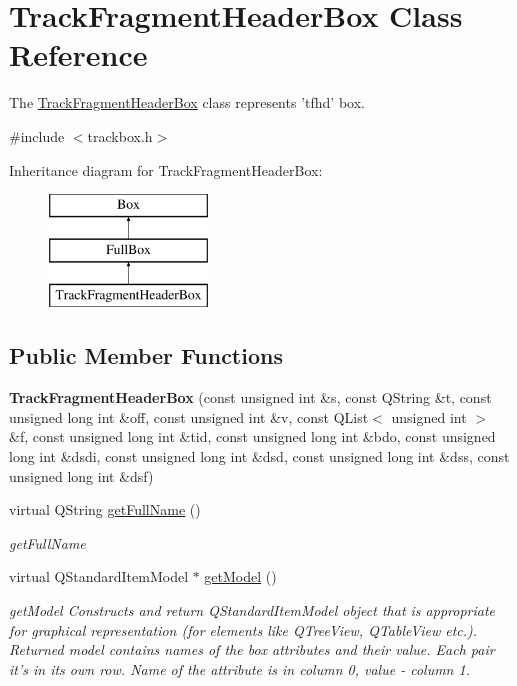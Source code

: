\hypertarget{class_track_fragment_header_box}{\section{Track\-Fragment\-Header\-Box Class Reference}
\label{class_track_fragment_header_box}
}


The \hyperlink{class_track_fragment_header_box}{Track\-Fragment\-Header\-Box} class represents 'tfhd' box.  




{\ttfamily \#include $<$trackbox.\-h$>$}

Inheritance diagram for Track\-Fragment\-Header\-Box\-:\begin{figure}[H]
\begin{center}
\leavevmode
\includegraphics[height=3.000000cm]{class_track_fragment_header_box}
\end{center}
\end{figure}
\subsection*{Public Member Functions}
\begin{DoxyCompactItemize}
\item 
\hypertarget{class_track_fragment_header_box_a603ad7cb83157c0bed94fdda506e6b07}{{\bfseries Track\-Fragment\-Header\-Box} (const unsigned int \&s, const Q\-String \&t, const unsigned long int \&off, const unsigned int \&v, const Q\-List$<$ unsigned int $>$ \&f, const unsigned long int \&tid, const unsigned long int \&bdo, const unsigned long int \&dsdi, const unsigned long int \&dsd, const unsigned long int \&dss, const unsigned long int \&dsf)}\label{class_track_fragment_header_box_a603ad7cb83157c0bed94fdda506e6b07}

\item 
virtual Q\-String \hyperlink{class_track_fragment_header_box_a6868fba2faed6053702b3c70751195e2}{get\-Full\-Name} ()
\begin{DoxyCompactList}\small\item\em get\-Full\-Name \end{DoxyCompactList}\item 
virtual Q\-Standard\-Item\-Model $\ast$ \hyperlink{class_track_fragment_header_box_ae27a4cc65245d755a88ae0661f568189}{get\-Model} ()
\begin{DoxyCompactList}\small\item\em get\-Model Constructs and return Q\-Standard\-Item\-Model object that is appropriate for graphical representation (for elements like Q\-Tree\-View, Q\-Table\-View etc.). Returned model contains names of the box attributes and their value. Each pair it's in its own row. Name of the attribute is in column 0, value -\/ column 1. \end{DoxyCompactList}\end{DoxyCompactItemize}
